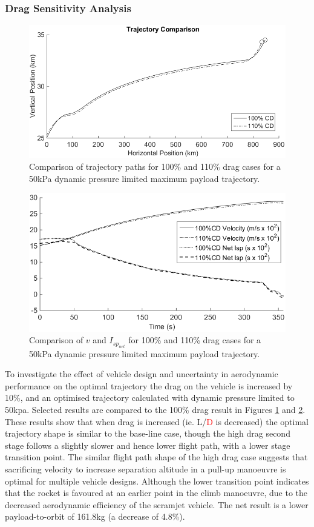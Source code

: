 \documentclass[journal]{new-aiaa}
\newcommand{\PayloadToOrbitHighDrag}{161.8}
\begin{document}
\subsubsection{Drag Sensitivity Analysis}\label{subsection:dragvariation}
\begin{figure}[ht]
	\centering
	\includegraphics[width=.7\linewidth]{DragComparisonTraj}
	\caption{Comparison of trajectory paths for 100\% and 110\% drag cases for a 50kPa dynamic pressure limited maximum payload trajectory.}
	\label{fig:DragCompTraj}
\end{figure}

\begin{figure}[ht]
	\centering
	\includegraphics[width=.6\linewidth]{DragComparisonOther}
	\caption{Comparison of $v$ and $I_{sp_{net}}$ for 100\% and 110\% drag cases for a 50kPa dynamic pressure limited maximum payload trajectory.}
	\label{fig:DragCompOther}
\end{figure}

To investigate the effect of vehicle design and uncertainty in aerodynamic performance on the optimal trajectory the drag on the vehicle is increased by 10\%, and an optimised trajectory calculated with dynamic pressure limited to 50kpa. Selected results are compared to the 100\% drag result in Figures \ref{fig:DragCompTraj} and \ref{fig:DragCompOther}. 
These results show that when drag is increased (ie. L/\textcolor{red}{D} is decreased) the optimal trajectory shape is similar to the base-line case, though the high drag second stage follows a slightly slower and hence lower flight path, with a lower stage transition point. The similar flight path shape of the high drag case suggests that sacrificing velocity to increase separation altitude in a pull-up manoeuvre is optimal for multiple vehicle designs. Although the lower transition point indicates that the rocket is favoured at an earlier point in the climb manoeuvre, due to the decreased aerodynamic efficiency of the scramjet vehicle. 
The net result is  a lower payload-to-orbit of \PayloadToOrbitHighDrag kg (a decrease of 4.8\%). 
\end{document}

